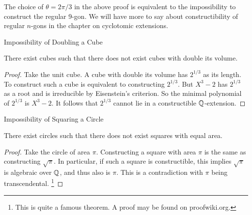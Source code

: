 \documentclass[../book.tex]{subfiles}
\begin{document}
\begin{rmk}
    
    The choice of $\theta = 2\pi / 3$ in the above proof
    is equivalent to the impossibility to construct the regular 9-gon. 
    We will have more to say about constructibility of regular $n$-gons 
    in the chapter on cyclotomic extensions.
    
\end{rmk}

\begin{cor} Impossibility of Doubling a Cube
    
    There exist cubes such that 
    there does not exist cubes with double its volume.
    
\end{cor}
\begin{proof}
    
    Take the unit cube. 
    A cube with double its volume has $2^{1/3}$ as its length.
    To construct such a cube is equivalent to constructing $2^{1/3}$.
    But $X^3 - 2$ has $2^{1/3}$ as a root and is irreducible by Eisenstein's criterion.
    So the minimal polynomial of $2^{1/3}$ is $X^3 - 2$.
    It follows that $2^{1/3}$ cannot lie in a constructible $\mathbb{Q}$-extension.
    
\end{proof}

\begin{cor} Impossibility of Squaring a Circle
    
    There exist circles such that
    there does not exist squares with equal area.
    
\end{cor}
\begin{proof}
    
    Take the circle of area $\pi$. 
    Constructing a square with area $\pi$ is the same as constructing $\sqrt{\pi}$.
    In particular, if such a square is constructible,
    this implies $\sqrt{\pi}$ is algebraic over $\mathbb{Q}$,
    and thus also is $\pi$.
    This is a contradiction with $\pi$ being transcendental.
    \footnote{This is quite a famous theorem. 
    A proof may be found on proofwiki.org.
    }
    
\end{proof}
\end{document}
